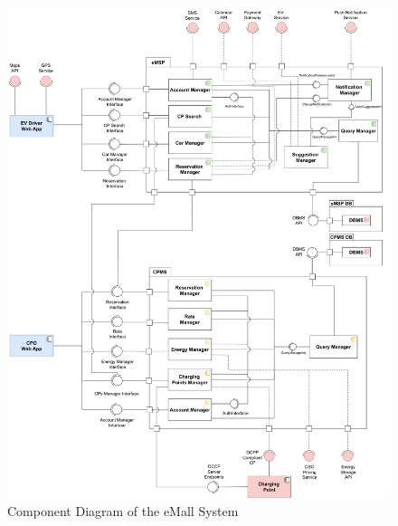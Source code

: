 \begin{figure}[H]
    \centering
    \hspace*{-1.7cm}
    \includegraphics[height=\textheight-0.1cm,keepaspectratio]{src/ComponentDiagram/component_diagram.pdf}
    \caption{Component Diagram of the eMall System}
\end{figure}

